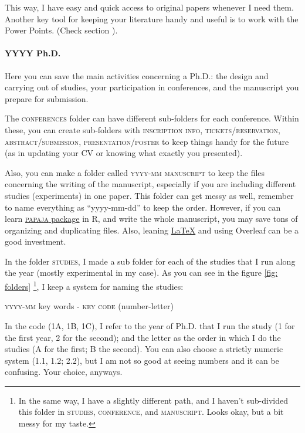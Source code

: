 \documentclass{article}
\begin{document}
This way, I have easy and quick access to original papers whenever I need them. Another key tool for keeping your literature handy and useful is to work with the Power Points. (Check section ).

\paragraph{YYYY Ph.D.}
\label{parag: YYYY}

Here you can save the main activities concerning a Ph.D.: the design and carrying out of studies, your participation in conferences, and the manuscript you prepare for submission. 

The \textsc{conferences} folder can have different sub-folders for each conference. Within these, you can create sub-folders with \textsc{inscription info, tickets/reservation, abstract/submission, presentation/poster} to keep things handy for the future (as in updating your \textsc{CV} or knowing what exactly you presented).

Also, you can make a folder called \textsc{yyyy-mm manuscript} to keep the files concerning the writing of the manuscript, especially if you are including different studies (experiments) in one paper. This folder can get messy as well, remember to name everything as “yyyy-mm-dd” to keep the order. However, if you can learn \href{https://crsh.github.io/papaja_man/}{\textsc{papaja} package}  in R, and write the whole manuscript, you may save tons of organizing and duplicating files. Also, leaning \href{https://www.latex-project.org/}{\LaTeX} and using Overleaf can be a good investment.

In the folder \textsc{studies}, I made a sub folder for each of the studies that I run along the year (mostly experimental in my case). As you can see in the figure \ref{fig: folders} \footnote{In the same way, I have a slightly different path, and I haven’t sub-divided this folder in \textsc{studies, conference,} and \textsc{manuscript}. Looks okay, but a bit messy for my taste.}, I keep a system for naming the studies:
\begin{center}
    \textsc{yyyy-mm} key words - \textsc{key code} (number-letter) 
\end{center}

In the code (\textsc{1A, 1B, 1C}), I refer to the year of Ph.D. that I run the study (1 for the first year, 2 for the second); and the letter as the order in which I do the studies (A for the first; B the second). You can also choose a strictly numeric system (1.1, 1.2; 2.2), but I am not so good at seeing numbers and it can be confusing. Your choice, anyways. 
\end{document}
